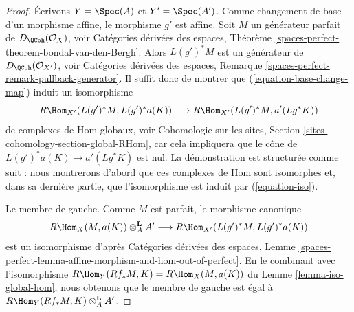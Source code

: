 \begin{proof}
Écrivons $Y = \Spec(A)$ et $Y' = \Spec(A')$. Comme changement de base d'un morphisme
affine, le morphisme $g'$ est affine. Soit $M$ un générateur parfait
de $D_\QCoh(\mathcal{O}_X)$, voir Catégories dérivées des espaces, Théorème
\ref{spaces-perfect-theorem-bondal-van-den-Bergh}. Alors $L(g')^*M$ est un
générateur de $D_\QCoh(\mathcal{O}_{X'})$, voir
Catégories dérivées des espaces, Remarque
\ref{spaces-perfect-remark-pullback-generator}.
Il suffit donc de montrer que (\ref{equation-base-change-map})
induit un isomorphisme
\begin{equation}
\label{equation-iso}
R\Hom_{X'}(L(g')^*M, L(g')^*a(K))
\longrightarrow
R\Hom_{X'}(L(g')^*M, a'(Lg^*K))
\end{equation}
de complexes de Hom globaux, voir
Cohomologie sur les sites, Section \ref{sites-cohomology-section-global-RHom},
car cela impliquera que le cône de $L(g')^*a(K) \to a'(Lg^*K)$
est nul.
La démonstration est structurée comme suit : nous montrerons d'abord que
ces complexes de Hom sont isomorphes et, dans sa dernière partie,
que l'isomorphisme est induit par (\ref{equation-iso}).

\medskip\noindent
Le membre de gauche. Comme $M$ est parfait, le morphisme canonique
$$
R\Hom_X(M, a(K)) \otimes^\mathbf{L}_A A'
\longrightarrow
R\Hom_{X'}(L(g')^*M, L(g')^*a(K))
$$
est un isomorphisme d'après Catégories dérivées des espaces, Lemme
\ref{spaces-perfect-lemma-affine-morphism-and-hom-out-of-perfect}.
En le combinant avec l'isomorphisme
$R\Hom_Y(Rf_*M, K) = R\Hom_X(M, a(K))$
du Lemme \ref{lemma-iso-global-hom},
nous obtenons que le membre de gauche est égal à
$R\Hom_Y(Rf_*M, K) \otimes^\mathbf{L}_A A'$.


\end{proof}
